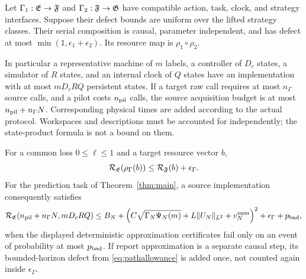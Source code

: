 \begin{theorem}\label{thm:morphism}
Let $\Gamma_1:\mathfrak E\to\mathfrak F$ and $\Gamma_2:\mathfrak F\to\mathfrak G$ have compatible action, task, clock, and strategy interfaces. Suppose their defect bounds are uniform over the lifted strategy classes. Their serial composition is causal, parameter independent, and has defect at most $\min(1,\epsilon_1+\epsilon_2)$. Its resource map is $\rho_1\circ\rho_2$.

In particular a representative machine of $m$ labels, a controller of $D_c$ states, a simulator of $R$ states, and an internal clock of $Q$ states have an implementation with at most $mD_cRQ$ persistent states. If a target raw call requires at most $n_\Gamma$ source calls, and a pilot costs $n_{\rm pil}$ calls, the source acquisition budget is at most $n_{\rm pil}+n_\Gamma N$. Corresponding physical times are added according to the actual protocol. Workspaces and descriptions must be accounted for independently; the state-product formula is not a bound on them.

For a common loss $0\le\ell\le1$ and a target resource vector $b$,
\begin{equation}\label{eq:risktransfer}
 \mathcal R_\mathfrak E(\rho_\Gamma(b))\le\mathcal R_\mathfrak F(b)+\epsilon_\Gamma.
\end{equation}
For the prediction task of Theorem~\ref{thm:main}, a source implementation consequently satisfies
\begin{equation}\label{eq:joint}
 \mathcal R_\mathfrak E(n_{\rm pil}+n_\Gamma N,mD_cRQ)
 \le B_N+\left(C\sqrt{\Gamma_N\Psi_N(m)}
       +L\lVert U_N\rVert_{L^2}+v_N^{\rm num}\right)^2+\epsilon_\Gamma+p_{\rm bad},
\end{equation}
when the displayed deterministic approximation certificates fail only on an event of probability at most $p_{\rm bad}$. If report approximation is a separate causal step, its bounded-horizon defect from \eqref{eq:pathallowance} is added once, not counted again inside $\epsilon_\Gamma$.
\end{theorem}
